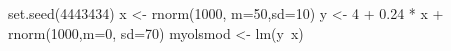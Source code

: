 \begin{Schunk}
\begin{Sinput}
 set.seed(4443434)
 x <- rnorm(1000, m=50,sd=10)
 y <- 4 + 0.24 * x + rnorm(1000,m=0, sd=70)
 myolsmod <- lm(y~x)
\end{Sinput}
\end{Schunk}
